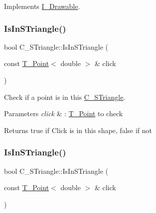 Implements \hyperlink{classI__Drawable_a25f6474325614c451a91f019e5fe8010}{I\+\_\+\+Drawable}.

\mbox{\label{classC__STriangle_ae0cfadc631baf280df7e77f011489caa}} 
\subsubsection{\texorpdfstring{Is\+In\+S\+Triangle()}{IsInSTriangle()}\hspace{0.1cm}{\footnotesize\ttfamily [1/2]}}
{\footnotesize\ttfamily bool C\+\_\+\+S\+Triangle\+::\+Is\+In\+S\+Triangle (\begin{DoxyParamCaption}\item[{const \hyperlink{classT__Point}{T\+\_\+\+Point}$<$ double $>$ \&}]{click }\end{DoxyParamCaption})}



Check if a point is in this \hyperlink{classC__STriangle}{C\+\_\+\+S\+Triangle}. 


\begin{DoxyParams}{Parameters}
{\em click} & \+: \hyperlink{classT__Point}{T\+\_\+\+Point} to check \\
\hline
\end{DoxyParams}
\begin{DoxyReturn}{Returns}
true if Click is in this shape, false if not 
\end{DoxyReturn}
\mbox{\label{classC__STriangle_ae0cfadc631baf280df7e77f011489caa}} 
\subsubsection{\texorpdfstring{Is\+In\+S\+Triangle()}{IsInSTriangle()}\hspace{0.1cm}{\footnotesize\ttfamily [2/2]}}
{\footnotesize\ttfamily bool C\+\_\+\+S\+Triangle\+::\+Is\+In\+S\+Triangle (\begin{DoxyParamCaption}\item[{const \hyperlink{classT__Point}{T\+\_\+\+Point}$<$ double $>$ \&}]{click }\end{DoxyParamCaption})}



